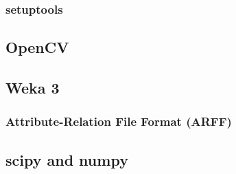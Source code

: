 \subsubsection{setuptools}


\subsection{OpenCV}


\subsection{Weka 3}

\subsubsection{Attribute-Relation File Format (ARFF)}


\subsection{scipy and numpy}
